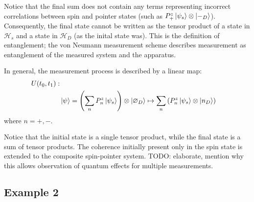 Notice that the final sum does not contain any terms representing incorrect correlations between spin and pointer states (such as $ P^z_+ \ket{\psi_s} \otimes \ket{-_D}$).  Consequently, the final state cannot be written as the tensor product of a state in $\mathcal{H}_s$ and a state in $\mathcal{H}_D$ (as the inital state was). This is the definition of entanglement; the von Neumann measurement scheme describes measurement as entanglement of the measured system and the apparatus.

In general, the measurement process is described by a linear map:
\begin{align}
    \nonumber U(t_0, t_1): \\
    & \ket{\psi} = \left(\sum_{n} P^z_n\ket{\psi_s}\right) \otimes \ket{\varnothing_D} \mapsto \sum_{n}\left(P^z_n\ket{\psi_s} \otimes \ket{n_D}\right)
\end{align}
where $n = +, -$.

Notice that the initial state is a single tensor product, while the final state is a sum of tensor products. The coherence initially present only in the spin state is extended to the composite spin-pointer system. TODO: elaborate, mention why this allows observation of quantum effects for multiple measurements.

\subsection{Example 2}

